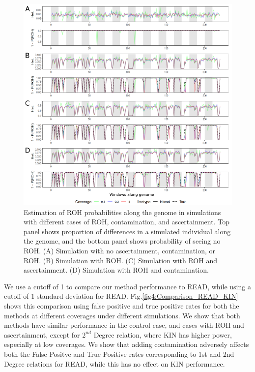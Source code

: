 \documentclass[12pt, letterpaper]{article}
\begin{document}
\begin{figure}[h!]
    \includegraphics[width=16cm]{plots/inkscape_finalImg/ROHplot_final.png}
    \centering
    \caption{Estimation of ROH probabilities along the genome in simulations with different cases of ROH, contamination, and ascertainment. Top panel shows proportion of differences in a simulated individual along the genome, and the bottom panel shows probability of seeing no ROH. (A) Simulation with no ascertainment, contamination, or ROH. (B) Simulation with ROH. (C) Simulation with ROH and ascertainment. (D) Simulation with ROH and contamination.}
    \label{fig2:ROH}
\end{figure}
We use a cutoff of 1 to compare our method performance to READ, while using a cutoff of 1 standard deviation for READ. Fig.\ref{fig4:Comparison_READ_KIN} shows this comparison using false positive and true positive rates for both the methods at different coverages under different simulations. We show that both methods have similar performance in the control case, and cases with ROH and ascertainment, except for $2^{nd}$ Degree relation, where KIN has higher power, especially at low coverages. We show that adding contamination adversely affects both the False Positve and True Positive rates corresponding to 1st and 2nd Degree relations for READ, while this has no effect on KIN performance.
\end{document}
